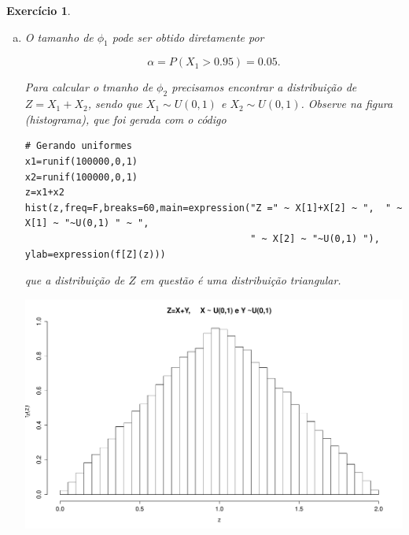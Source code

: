 \documentclass[letter,11pt]{article}
\newtheorem{exer}{Exercício}
\begin{document}
\begin{exer} \rm 
% 

\begin{enumerate}[a)]
% 
% 
% 

\item 
O tamanho de $\phi_1$ pode ser obtido diretamente por 

\[\alpha=P(X_1>0.95)=0.05.\]


Para calcular o tmanho de $\phi_2$ precisamos encontrar a distribuição de $Z=X_1+X_2$, sendo que $X_1\sim U(0,1)$ e $X_2\sim U(0,1)$. Observe na figura (histograma), que foi gerada com o código 
\begin{verbatim}
# Gerando uniformes
x1=runif(100000,0,1)
x2=runif(100000,0,1)
z=x1+x2
hist(z,freq=F,breaks=60,main=expression("Z =" ~ X[1]+X[2] ~ ",  " ~ X[1] ~ "~U(0,1) " ~ ",  
                                        " ~ X[2] ~ "~U(0,1) "), ylab=expression(f[Z](z)))
\end{verbatim}

que a distribuição de $Z$ em questão é uma distribuição triangular.

\begin{center}
\includegraphics[scale=0.4]{sumunif.pdf} 
\end{center} 


\end{enumerate}
\end{exer}
\end{document}

